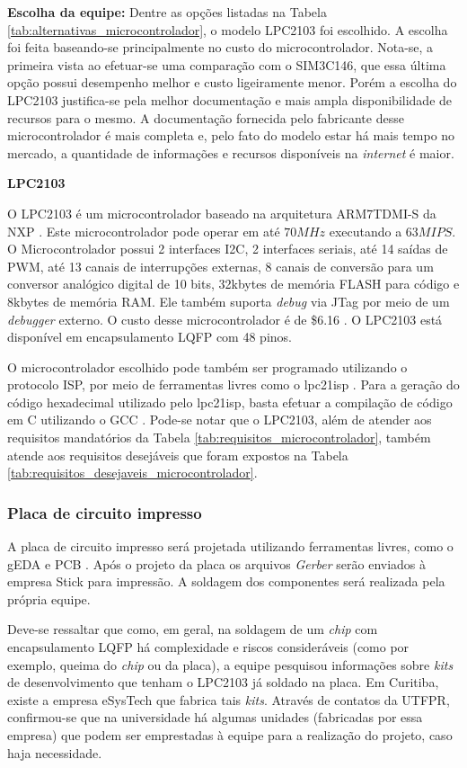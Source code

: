\textbf{Escolha da equipe:} Dentre as opções listadas na Tabela \ref{tab:alternativas_microcontrolador}, o modelo LPC2103 foi escolhido. A escolha foi feita baseando-se principalmente no custo do microcontrolador. Nota-se, a primeira vista ao efetuar-se uma comparação com o SIM3C146, que essa última opção possui desempenho melhor e custo ligeiramente menor. Porém a escolha do LPC2103 justifica-se pela melhor documentação e mais ampla disponibilidade de recursos para o mesmo. A documentação fornecida pelo fabricante desse microcontrolador é mais completa e, pelo fato do modelo estar há mais tempo no mercado, a quantidade de informações e recursos disponíveis na \textit{internet} é maior.

\textbf{LPC2103}

O LPC2103 é um microcontrolador baseado na arquitetura ARM7TDMI-S da NXP \cite{lpc2103}. Este microcontrolador pode operar em até $ 70MHz $ executando a $ 63MIPS $. O Microcontrolador possui 2 interfaces I2C, 2 interfaces seriais, até 14 saídas de PWM, até 13 canais de interrupções externas, 8 canais de conversão para um conversor analógico digital de 10 bits, 32kbytes de memória FLASH para código e 8kbytes de memória RAM. Ele também suporta \textit{debug} via JTag por meio de um \textit{debugger} externo. O custo desse microcontrolador é de \$6.16 \cite{digikey}. O LPC2103 está disponível em encapsulamento LQFP com 48 pinos.

O microcontrolador escolhido pode também ser programado utilizando o protocolo ISP, por meio de ferramentas livres como o lpc21isp \cite{lpc21isp}. Para a geração do código hexadecimal utilizado pelo lpc21isp, basta efetuar a compilação de código em C utilizando o GCC \cite{gcc}.
Pode-se notar que o LPC2103, além de atender aos requisitos mandatórios da Tabela \ref{tab:requisitos_microcontrolador}, também atende aos requisitos desejáveis que foram expostos na Tabela \ref{tab:requisitos_desejaveis_microcontrolador}.

\subsubsection{Placa de circuito impresso}

A placa de circuito impresso será projetada utilizando ferramentas livres, como o gEDA \cite{geda} e PCB \cite{pcb}. Após o projeto da placa os arquivos \textit{Gerber} serão enviados à empresa Stick \cite{stick} para impressão. A soldagem dos componentes será realizada pela própria equipe.

Deve-se ressaltar que como, em geral, na soldagem de um \textit{chip} com encapsulamento LQFP há complexidade e riscos consideráveis (como por exemplo, queima do \textit{chip} ou da placa), a equipe pesquisou informações sobre \textit{kits} de desenvolvimento que tenham o LPC2103 já soldado na placa. Em Curitiba, existe a empresa eSysTech \cite{esystech} que fabrica tais \textit{kits}. Através de contatos da UTFPR, confirmou-se que na universidade há algumas unidades (fabricadas por essa empresa) que podem ser emprestadas à equipe para a realização do projeto, caso haja necessidade.
